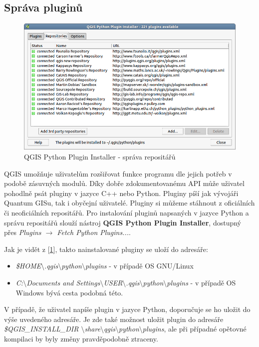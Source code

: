 \subsection{Správa pluginů}
\begin{figure}[h]
	\centering
	\includegraphics[scale=0.5]{pictures/qgis_plugin/python_installer}
	\caption{QGIS Python Plugin Installer - správa repositářů}
  	\label{pythonplugininstaller}
\end{figure}

QGIS umožňuje uživatelům rozšiřovat funkce programu dle jejich potřeb
v podobě zásuvných modulů. Díky dobře zdokumentovanému API může
uživatel pohodlně psát pluginy v jazyce C++ nebo Python. Pluginy píší
jak vývojáři Quantum GISu, tak i obyčejní uživatelé. Pluginy si můžeme
stáhnout z oficiálních či neoficiálních repositářů. Pro instalování
pluginů napsaných v jazyce Python a správu repositářů slouží
nástroj \textbf{QGIS Python Plugin Installer}, dostupný
přes \textit{Plugins $\rightarrow$ Fetch Python Plugins...}.

\noindent Jak je vidět z [\figurename \ref{pythonplugininstaller}], takto nainstalované pluginy se uloží do adresáře: 

\begin{itemize}
	\item \textit{\$HOME$\setminus$.qgis$\setminus$python$\setminus$plugins} - v případě OS GNU/Linux
	\item \textit{C:$\setminus$Documents and Settings$\setminus$USER$\setminus$.qgis$\setminus$python$\setminus$plugins} - v případě OS Windows bývá cesta podobná této.
\end{itemize}

V případě, že uživatel napíše plugin v jazyce Python, doporučuje se ho
uložit do výše uvedeného adresáře. Je zde také možnost uložit plugin
do adresáře \textit{\$QGIS\_INSTALL\_DIR
$\setminus$share$\setminus$qgis$\setminus$python$\setminus$plugins},
ale při případné opětovné kompilaci by byly změny pravděpodobně
ztraceny.

